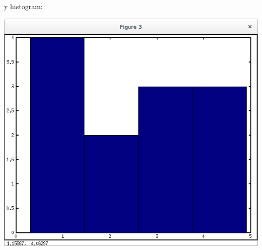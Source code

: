 \documentclass[10pt,a4paper]{article}
\begin{document}
\pagebreak

y histogram:

\includegraphics[scale=0.6]{yhist}
\end{document}

